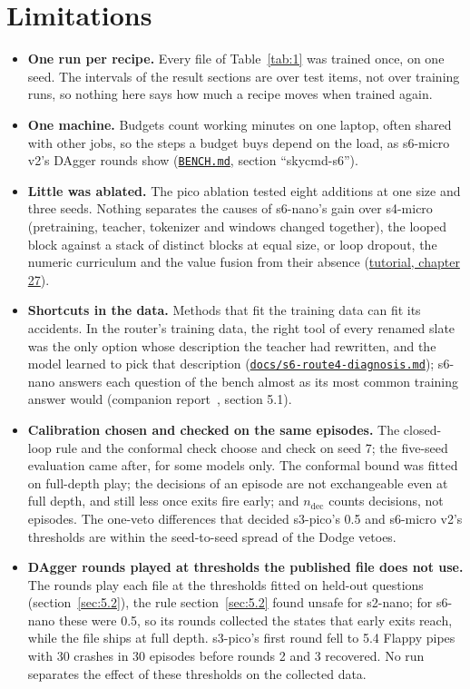 \documentclass[10pt]{article}
\begin{document}
\section{Limitations}\label{sec:9}

\begin{itemize}
\item \textbf{One run per recipe.} Every file of Table~\ref{tab:1} was trained once, on one seed. The intervals of the result sections are over test items, not over training runs, so nothing here says how much a recipe moves when trained again.
\item \textbf{One machine.} Budgets count working minutes on one laptop, often shared with other jobs, so the steps a budget buys depend on the load, as s6-micro v2's DAgger rounds show (\href{https://github.com/maxgfr/skycmd/blob/main/BENCH.md}{\texttt{BENCH.md}}, section ``skycmd-s6'').
\item \textbf{Little was ablated.} The pico ablation tested eight additions at one size and three seeds. Nothing separates the causes of s6-nano's gain over s4-micro (pretraining, teacher, tokenizer and windows changed together), the looped block against a stack of distinct blocks at equal size, or loop dropout, the numeric curriculum and the value fusion from their absence (\href{https://maxgfr.github.io/skycmd/tutorial/27-s6-nano}{tutorial, chapter 27}).
\item \textbf{Shortcuts in the data.} Methods that fit the training data can fit its accidents. In the router's training data, the right tool of every renamed slate was the only option whose description the teacher had rewritten, and the model learned to pick that description (\href{https://github.com/maxgfr/skycmd/blob/main/docs/s6-route4-diagnosis.md}{\texttt{docs/\allowbreak{}s6-route4-diagnosis.md}}); s6-nano answers each question of the bench almost as its most common training answer would (companion report~\cite{golfier2026skycmd}, section 5.1).
\item \textbf{Calibration chosen and checked on the same episodes.} The closed-loop rule and the conformal check choose and check on seed 7; the five-seed evaluation came after, for some models only. The conformal bound was fitted on full-depth play; the decisions of an episode are not exchangeable even at full depth, and still less once exits fire early; and $n_{\mathrm{dec}}$ counts decisions, not episodes. The one-veto differences that decided s3-pico's 0.5 and s6-micro v2's thresholds are within the seed-to-seed spread of the Dodge vetoes.
\item \textbf{DAgger rounds played at thresholds the published file does not use.} The rounds play each file at the thresholds fitted on held-out questions (section~\ref{sec:5.2}), the rule section~\ref{sec:5.2} found unsafe for s2-nano; for s6-nano these were 0.5, so its rounds collected the states that early exits reach, while the file ships at full depth. s3-pico's first round fell to 5.4 Flappy pipes with 30 crashes in 30 episodes before rounds 2 and 3 recovered. No run separates the effect of these thresholds on the collected data.

\end{itemize}
\end{document}
